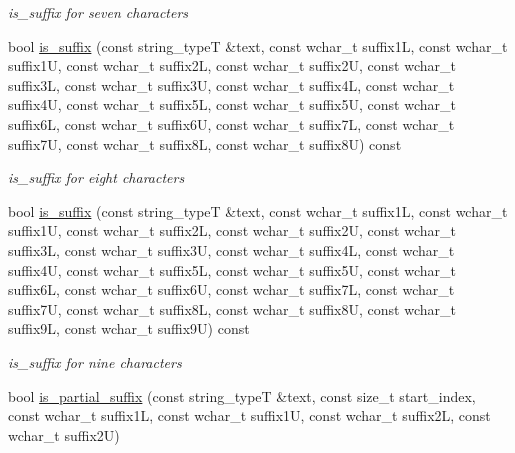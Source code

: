 \begin{DoxyCompactItemize}
\begin{DoxyCompactList}\small\item\em is\-\_\-suffix for seven characters \end{DoxyCompactList}\item 
\hypertarget{group___stemming_gaa18daf5b33d220d93dff22d6e591edd6}{bool \hyperlink{group___stemming_gaa18daf5b33d220d93dff22d6e591edd6}{is\-\_\-suffix} (const string\-\_\-type\-T \&text, const wchar\-\_\-t suffix1\-L, const wchar\-\_\-t suffix1\-U, const wchar\-\_\-t suffix2\-L, const wchar\-\_\-t suffix2\-U, const wchar\-\_\-t suffix3\-L, const wchar\-\_\-t suffix3\-U, const wchar\-\_\-t suffix4\-L, const wchar\-\_\-t suffix4\-U, const wchar\-\_\-t suffix5\-L, const wchar\-\_\-t suffix5\-U, const wchar\-\_\-t suffix6\-L, const wchar\-\_\-t suffix6\-U, const wchar\-\_\-t suffix7\-L, const wchar\-\_\-t suffix7\-U, const wchar\-\_\-t suffix8\-L, const wchar\-\_\-t suffix8\-U) const }\label{group___stemming_gaa18daf5b33d220d93dff22d6e591edd6}

\begin{DoxyCompactList}\small\item\em is\-\_\-suffix for eight characters \end{DoxyCompactList}\item 
\hypertarget{group___stemming_gab905150e381f068c6b04eba851bb6263}{bool \hyperlink{group___stemming_gab905150e381f068c6b04eba851bb6263}{is\-\_\-suffix} (const string\-\_\-type\-T \&text, const wchar\-\_\-t suffix1\-L, const wchar\-\_\-t suffix1\-U, const wchar\-\_\-t suffix2\-L, const wchar\-\_\-t suffix2\-U, const wchar\-\_\-t suffix3\-L, const wchar\-\_\-t suffix3\-U, const wchar\-\_\-t suffix4\-L, const wchar\-\_\-t suffix4\-U, const wchar\-\_\-t suffix5\-L, const wchar\-\_\-t suffix5\-U, const wchar\-\_\-t suffix6\-L, const wchar\-\_\-t suffix6\-U, const wchar\-\_\-t suffix7\-L, const wchar\-\_\-t suffix7\-U, const wchar\-\_\-t suffix8\-L, const wchar\-\_\-t suffix8\-U, const wchar\-\_\-t suffix9\-L, const wchar\-\_\-t suffix9\-U) const }\label{group___stemming_gab905150e381f068c6b04eba851bb6263}

\begin{DoxyCompactList}\small\item\em is\-\_\-suffix for nine characters \end{DoxyCompactList}\item 
\hypertarget{group___stemming_ga2ae63cf92bc4f4f40f0093e4842a235f}{bool \hyperlink{group___stemming_ga2ae63cf92bc4f4f40f0093e4842a235f}{is\-\_\-partial\-\_\-suffix} (const string\-\_\-type\-T \&text, const size\-\_\-t start\-\_\-index, const wchar\-\_\-t suffix1\-L, const wchar\-\_\-t suffix1\-U, const wchar\-\_\-t suffix2\-L, const wchar\-\_\-t suffix2\-U)}\label{group___stemming_ga2ae63cf92bc4f4f40f0093e4842a235f}


\end{DoxyCompactItemize}
